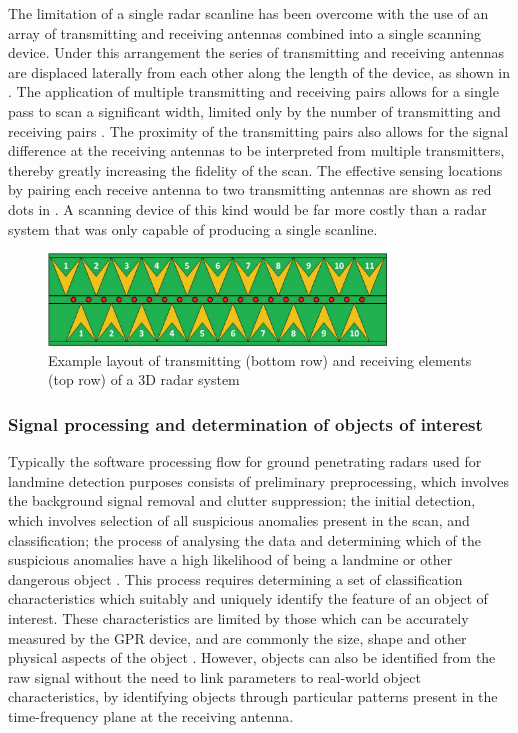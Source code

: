 \documentclass[main.tex]{subfiles}
\begin{document}
The limitation of a single radar scanline has been overcome with the use of an array of transmitting and receiving antennas combined into a single scanning device. Under this arrangement the series of transmitting and receiving antennas are displaced laterally from each other along the length of the device, as shown in . The application of multiple transmitting and receiving pairs allows for a single pass to scan a significant width, limited only by the number of transmitting and receiving pairs \parencite{3dradarDX}. The proximity of the transmitting pairs also allows for the signal difference at the receiving antennas to be interpreted from multiple transmitters, thereby greatly increasing the fidelity of the scan. The effective sensing locations by pairing each receive antenna to two transmitting antennas are shown as red dots in . A scanning device of this kind would be far more costly than a radar system that was only capable of producing a single scanline.

\begin{figure}[ht]
\centering
\includegraphics[width=0.8\textwidth]{2-LiteratureReview/3d-radar.png}
\caption[Example layout of transmitting and receiving elements of a 3D radar system]{Example layout of transmitting (bottom row) and receiving elements (top row) of a 3D radar system \parencite{3dradarDXG}}
\end{figure}

\subsubsection{Signal processing and determination of objects of interest}
Typically the software processing flow for ground penetrating radars used for landmine detection purposes consists of preliminary preprocessing, which involves the background signal removal and clutter suppression; the initial detection, which involves selection of all suspicious anomalies present in the scan, and classification; the process of analysing the data and determining which of the suspicious anomalies have a high likelihood of being a landmine or other dangerous object \parencite{Ho.etal2004}. This process requires determining a set of classification characteristics which suitably and uniquely identify the feature of an object of interest. These characteristics are limited by those which can be accurately measured by the GPR device, and are commonly the size, shape and other physical aspects of the object \parencite{Ho2008}. However, objects can also be identified from the raw signal without the need to link parameters to real-world object characteristics, by identifying objects through particular patterns present in the time-frequency plane at the receiving antenna.
\end{document}

